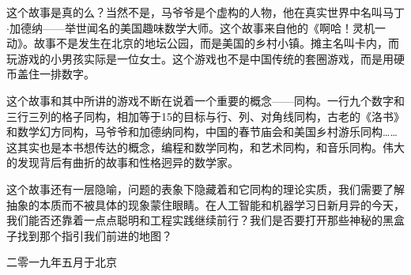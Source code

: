 \documentclass[UTF8]{article}
\begin{document}
这个故事是真的么？当然不是，马爷爷是个虚构的人物，他在真实世界中名叫马丁$\cdot$加德纳——举世闻名的美国趣味数学大师。这个故事来自他的《啊哈！灵机一动》。故事不是发生在北京的地坛公园，而是美国的乡村小镇。摊主名叫卡内，而玩游戏的小男孩实际是一位女士。这个游戏也不是中国传统的套圈游戏，而是用硬币盖住一排数字。

这个故事和其中所讲的游戏不断在说着一个重要的概念——同构。一行九个数字和三行三列的格子同构，相加等于15的目标与行、列、对角线同构，古老的《洛书》和数学幻方同构，马爷爷和加德纳同构，中国的春节庙会和美国乡村游乐同构……这其实也是本书想传达的概念，编程和数学同构，和艺术同构，和音乐同构。伟大的发现背后有曲折的故事和性格迥异的数学家。

这个故事还有一层隐喻，问题的表象下隐藏着和它同构的理论实质，我们需要了解抽象的本质而不被具体的现象蒙住眼睛。在人工智能和机器学习日新月异的今天，我们能否还靠着一点点聪明和工程实践继续前行？我们是否要打开那些神秘的黑盒子找到那个指引我们前进的地图？

\vspace{15mm}

二零一九年五月于北京

\ifx\wholebook\relax \else

\expandafter\enddocument

\fi
\end{document}
